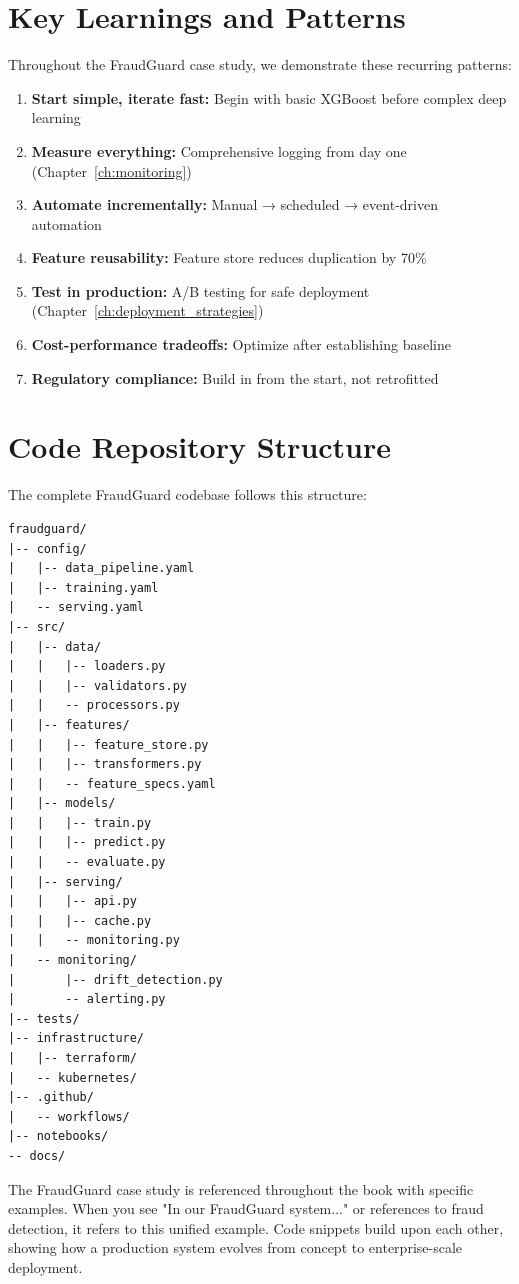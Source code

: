 \section{Key Learnings and Patterns}

Throughout the FraudGuard case study, we demonstrate these recurring patterns:

\begin{enumerate}
    \item \textbf{Start simple, iterate fast:} Begin with basic XGBoost before complex deep learning

    \item \textbf{Measure everything:} Comprehensive logging from day one (Chapter~\ref{ch:monitoring})

    \item \textbf{Automate incrementally:} Manual → scheduled → event-driven automation

    \item \textbf{Feature reusability:} Feature store reduces duplication by 70\%

    \item \textbf{Test in production:} A/B testing for safe deployment (Chapter~\ref{ch:deployment_strategies})

    \item \textbf{Cost-performance tradeoffs:} Optimize after establishing baseline

    \item \textbf{Regulatory compliance:} Build in from the start, not retrofitted
\end{enumerate}

\section{Code Repository Structure}

The complete FraudGuard codebase follows this structure:

\begin{lstlisting}[style=shell]
fraudguard/
|-- config/
|   |-- data_pipeline.yaml
|   |-- training.yaml
|   -- serving.yaml
|-- src/
|   |-- data/
|   |   |-- loaders.py
|   |   |-- validators.py
|   |   -- processors.py
|   |-- features/
|   |   |-- feature_store.py
|   |   |-- transformers.py
|   |   -- feature_specs.yaml
|   |-- models/
|   |   |-- train.py
|   |   |-- predict.py
|   |   -- evaluate.py
|   |-- serving/
|   |   |-- api.py
|   |   |-- cache.py
|   |   -- monitoring.py
|   -- monitoring/
|       |-- drift_detection.py
|       -- alerting.py
|-- tests/
|-- infrastructure/
|   |-- terraform/
|   -- kubernetes/
|-- .github/
|   -- workflows/
|-- notebooks/
-- docs/
\end{lstlisting}

\vspace{1em}

\begin{bestpractice}
The FraudGuard case study is referenced throughout the book with specific examples. When you see "In our FraudGuard system..." or references to fraud detection, it refers to this unified example. Code snippets build upon each other, showing how a production system evolves from concept to enterprise-scale deployment.
\end{bestpractice}
